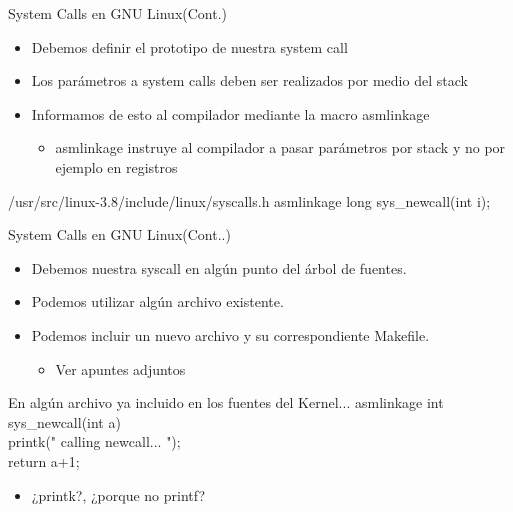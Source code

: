 \begin{frame}{System Calls en GNU Linux(Cont.)}
   \begin{itemize}  
   \item Debemos definir el prototipo de nuestra system call 
   \item Los parámetros a system calls deben ser realizados por medio del stack
   \item Informamos de esto al compilador mediante la macro asmlinkage
    \begin{itemize}
	 \item \alert{asmlinkage} instruye al compilador a pasar parámetros por stack y no 
          por ejemplo en registros 
    \end{itemize}   
 \end{itemize}

\begin{block}{/usr/src/linux-3.8/include/linux/syscalls.h}
asmlinkage long sys\_newcall(int i);

\end{block}

\end{frame}

\begin{frame}{System Calls en GNU Linux(Cont..)}
   \begin{itemize}  
   \item Debemos nuestra syscall en algún punto del árbol de fuentes. 
   \item Podemos utilizar algún archivo existente.
   \item Podemos incluir un nuevo archivo y su correspondiente Makefile. 
   \begin{itemize}
	 \item \alert{Ver apuntes adjuntos} 
    \end{itemize}   
 \end{itemize}

\begin{block}{En algún archivo ya incluido en los fuentes del Kernel...}
asmlinkage int sys\_newcall(int a) { \\
	printk(" calling newcall... ");   \\
return a+1; \\
}
\end{block}
   \begin{itemize}
	 \item \alert{¿printk?}, ¿porque no printf? 
    \end{itemize}   

\end{frame}

